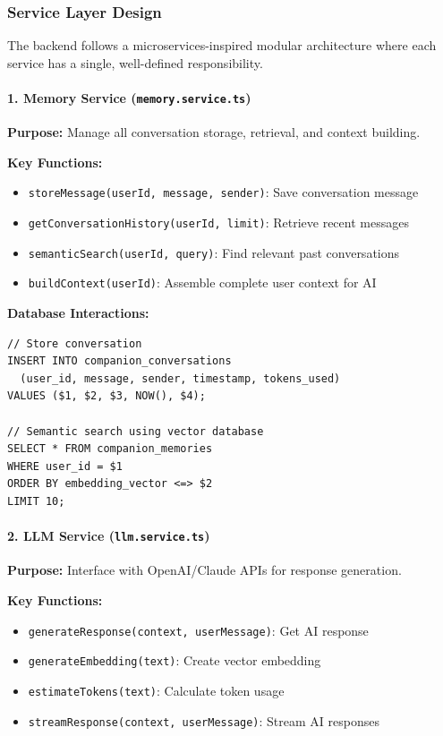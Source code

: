 \documentclass[12pt,a4paper]{article}
\begin{document}
\subsubsection{Service Layer Design}

The backend follows a microservices-inspired modular architecture where each service has a single, well-defined responsibility.

\paragraph{1. Memory Service (\texttt{memory.service.ts})}

\textbf{Purpose:} Manage all conversation storage, retrieval, and context building.

\textbf{Key Functions:}
\begin{itemize}
    \item \texttt{storeMessage(userId, message, sender)}: Save conversation message
    \item \texttt{getConversationHistory(userId, limit)}: Retrieve recent messages
    \item \texttt{semanticSearch(userId, query)}: Find relevant past conversations
    \item \texttt{buildContext(userId)}: Assemble complete user context for AI
\end{itemize}

\textbf{Database Interactions:}
\begin{verbatim}
// Store conversation
INSERT INTO companion_conversations 
  (user_id, message, sender, timestamp, tokens_used)
VALUES ($1, $2, $3, NOW(), $4);

// Semantic search using vector database
SELECT * FROM companion_memories 
WHERE user_id = $1 
ORDER BY embedding_vector <=> $2 
LIMIT 10;
\end{verbatim}

\paragraph{2. LLM Service (\texttt{llm.service.ts})}

\textbf{Purpose:} Interface with OpenAI/Claude APIs for response generation.

\textbf{Key Functions:}
\begin{itemize}
    \item \texttt{generateResponse(context, userMessage)}: Get AI response
    \item \texttt{generateEmbedding(text)}: Create vector embedding
    \item \texttt{estimateTokens(text)}: Calculate token usage
    \item \texttt{streamResponse(context, userMessage)}: Stream AI responses
\end{itemize}
\end{document}
